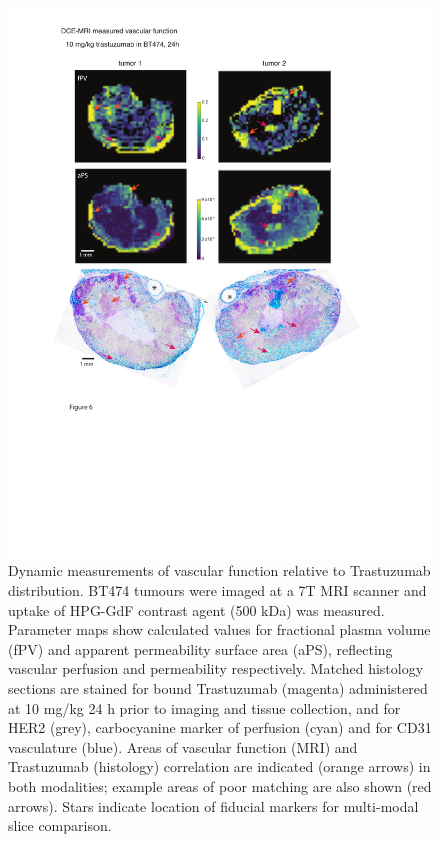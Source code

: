 \begin{figure}[htbp] %
  \centering
  \includegraphics[width=\textwidth]{hpg/hpg-paper2-images/Fig6.pdf} 
  \caption{Dynamic measurements of vascular function relative to Trastuzumab distribution. \acs{BT474} tumours were imaged at a 7T MRI scanner and uptake of \acs{HPG-GdF} contrast agent (500 kDa) was measured. 
  Parameter maps show calculated values for fractional plasma volume (\acs{fPV}) and apparent permeability surface area (\acs{aPS}), reflecting vascular perfusion and permeability respectively. 
  Matched histology sections are stained for bound Trastuzumab (magenta) administered at 10 mg/kg 24 h prior to imaging and tissue collection, and for \acs{HER2} (grey), carbocyanine marker of perfusion (cyan) and for CD31 vasculature (blue). 
  Areas of vascular function (MRI) and Trastuzumab (histology) correlation are indicated (orange arrows) in both modalities; example areas of poor matching are also shown (red arrows). 
  Stars indicate location of fiducial markers for multi-modal slice comparison.}
  \label{hpgpaper2:fig6}
\end{figure}

